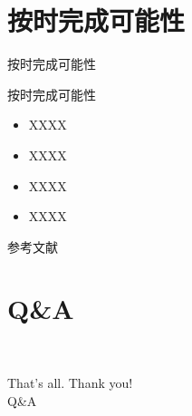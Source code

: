 \documentclass[compress]{beamer}
\begin{document}
\section{按时完成可能性}

\begin{frame}{按时完成可能性}
  \begin{block}{按时完成可能性}
    \begin{itemize}
      \setlength{\itemsep}{6pt}
      \item XXXX\cite{Chen1992}
      \item XXXX\cite{Gravagne2003}
      \item XXXX\cite{xin1994}
      \item XXXX\cite{zhai2015}
    \end{itemize}
  \end{block}
\end{frame}



\begin{frame}[allowframebreaks]{参考文献}
  
\end{frame}

\section{Q\&A}

\begin{frame}{\secname~ }
	\begin{center}
 		\huge {That's all. Thank you!}\\
		\vspace{1cm}
		\huge {Q\&A}
	\end{center}
\end{frame}

\end{document}
